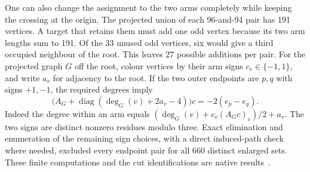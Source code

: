 \documentclass[11pt,a4paper]{article}
\theoremstyle{definition}
\theoremstyle{remark}
\begin{document}
One can also change the assignment to the two arms completely while
keeping the crossing at the origin. The projected union of each
96-and-94 pair has 191 vertices. A target that retains them must
add one odd vertex because its two arm lengths sum to 191.
Of the 33 unused odd vertices, six would give a third occupied
neighbour of the root. This leaves 27 possible additions per pair.
For the projected graph $G$ off the root, colour vertices by their
arm signs $c_v\in\{-1,1\}$, and write $a_v$ for adjacency to the
root. If the two outer endpoints are $p,q$ with signs $+1,-1$,
the required degrees imply
\[
 \bigl(A_G+\operatorname{diag}(\deg_G(v)+2a_v-4)\bigr)c
       =-2(e_p-e_q).
\]
Indeed the degree within an arm equals
$(\deg_G(v)+c_v(A_Gc)_v)/2+a_v$. The two signs are distinct
nonzero residues modulo three. Exact elimination and enumeration
of the remaining sign choices, with a direct induced-path check
where needed, excluded every endpoint pair for all 660 distinct
enlarged sets. These finite computations and the cut identifications
are native results~\cite{q8parents246}.
\end{document}
